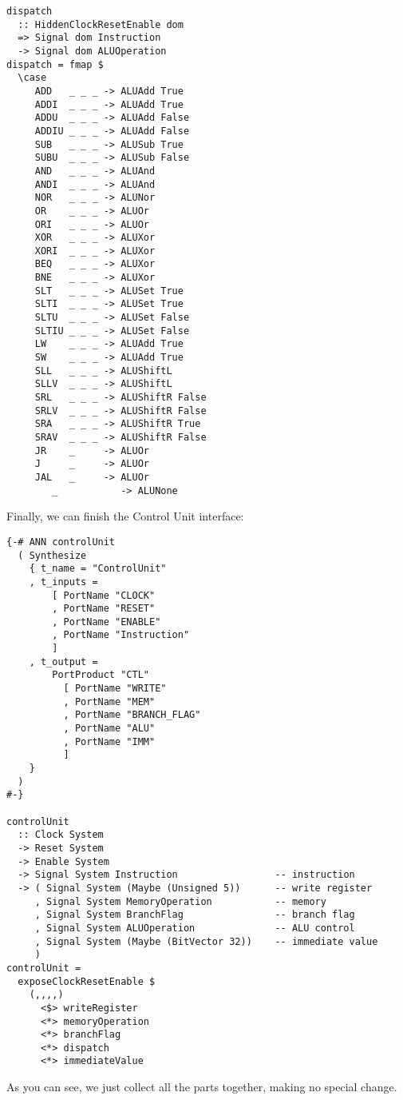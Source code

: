 \begin{verbatim}
dispatch 
  :: HiddenClockResetEnable dom
  => Signal dom Instruction
  -> Signal dom ALUOperation
dispatch = fmap $
  \case 
     ADD   _ _ _ -> ALUAdd True
     ADDI  _ _ _ -> ALUAdd True
     ADDU  _ _ _ -> ALUAdd False
     ADDIU _ _ _ -> ALUAdd False
     SUB   _ _ _ -> ALUSub True
     SUBU  _ _ _ -> ALUSub False
     AND   _ _ _ -> ALUAnd
     ANDI  _ _ _ -> ALUAnd
     NOR   _ _ _ -> ALUNor
     OR    _ _ _ -> ALUOr
     ORI   _ _ _ -> ALUOr
     XOR   _ _ _ -> ALUXor
     XORI  _ _ _ -> ALUXor
     BEQ   _ _ _ -> ALUXor
     BNE   _ _ _ -> ALUXor
     SLT   _ _ _ -> ALUSet True
     SLTI  _ _ _ -> ALUSet True
     SLTU  _ _ _ -> ALUSet False
     SLTIU _ _ _ -> ALUSet False
     LW    _ _ _ -> ALUAdd True
     SW    _ _ _ -> ALUAdd True
     SLL   _ _ _ -> ALUShiftL
     SLLV  _ _ _ -> ALUShiftL
     SRL   _ _ _ -> ALUShiftR False
     SRLV  _ _ _ -> ALUShiftR False
     SRA   _ _ _ -> ALUShiftR True
     SRAV  _ _ _ -> ALUShiftR False
     JR    _     -> ALUOr
     J     _     -> ALUOr
     JAL   _     -> ALUOr
        _           -> ALUNone
\end{verbatim}

Finally, we can finish the Control Unit interface:

\begin{verbatim}
{-# ANN controlUnit
  ( Synthesize
    { t_name = "ControlUnit"
    , t_inputs =
        [ PortName "CLOCK"
        , PortName "RESET"
        , PortName "ENABLE"
        , PortName "Instruction"
        ]
    , t_output =
        PortProduct "CTL"
          [ PortName "WRITE"
          , PortName "MEM"
          , PortName "BRANCH_FLAG"
          , PortName "ALU"
          , PortName "IMM"
          ]
    }
  )
#-}

controlUnit 
  :: Clock System
  -> Reset System
  -> Enable System
  -> Signal System Instruction                 -- instruction
  -> ( Signal System (Maybe (Unsigned 5))      -- write register
     , Signal System MemoryOperation           -- memory
     , Signal System BranchFlag                -- branch flag
     , Signal System ALUOperation              -- ALU control
     , Signal System (Maybe (BitVector 32))    -- immediate value
     )
controlUnit =
  exposeClockResetEnable $
    (,,,,) 
      <$> writeRegister 
      <*> memoryOperation 
      <*> branchFlag 
      <*> dispatch 
      <*> immediateValue
\end{verbatim}
As you can see, we just collect all the parts together, making no special change.
